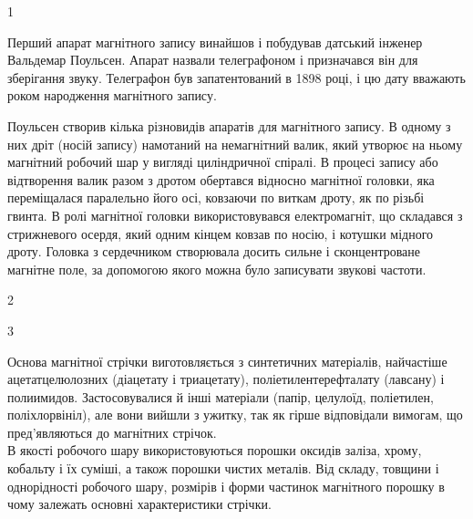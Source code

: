 \documentclass[a4paper,14pt]{extreport}
\begin{document}
  \noindent{\color{blue} \rule{\linewidth}{0.7mm}}
  \begin{center}1\end{center}
  \noindent{\color{blue} \rule{\linewidth}{0.7mm}}

  Перший апарат магнітного запису винайшов і побудував датський інженер Вальдемар Поульсен. Апарат назвали телеграфоном і призначався він для зберігання звуку. Телеграфон був запатентований в 1898 році, і цю дату вважають роком народження магнітного запису.\par
  \begin{figure}[h]
  \end{figure}
  Поульсен створив кілька різновидів апаратів для магнітного запису. В одному з них дріт (носій запису) намотаний на немагнітний валик, який утворює на ньому магнітний робочий шар у вигляді циліндричної спіралі. В процесі запису або відтворення валик разом з дротом
  обертався відносно магнітної головки, яка переміщалася паралельно його осі, ковзаючи по виткам дроту, як по різьбі гвинта. В ролі магнітної головки використовувався електромагніт, що складався з стрижневого осердя, який одним кінцем ковзав по носію, і котушки мідного дроту. Головка з сердечником створювала досить сильне і сконцентроване магнітне поле, за допомогою якого можна було записувати звукові частоти.\par
\noindent{\color{blue} \rule{\linewidth}{0.7mm}}
\begin{center}2\end{center}
\noindent{\color{blue} \rule{\linewidth}{0.7mm}}

  \noindent{\color{blue} \rule{\linewidth}{0.7mm}}
  \begin{center}3\end{center}
  \noindent{\color{blue} \rule{\linewidth}{0.7mm}}
  Основа магнітної стрічки виготовляється з синтетичних матеріалів, найчастіше ацетатцелюлозних (діацетату і триацетату), поліетилентерефталату (лавсану) і полиимидов. Застосовувалися й інші матеріали (папір, целулоїд, поліетилен, поліхлорвініл), але вони вийшли з ужитку, так як гірше відповідали вимогам, що пред'являються до магнітних стрічок.\\

  В якості робочого шару використовуються порошки оксидів заліза, хрому, кобальту і їх суміші, а також порошки чистих металів. Від складу, товщини і однорідності робочого шару, розмірів і форми частинок магнітного порошку в чому залежать основні характеристики стрічки.
\end{document}
